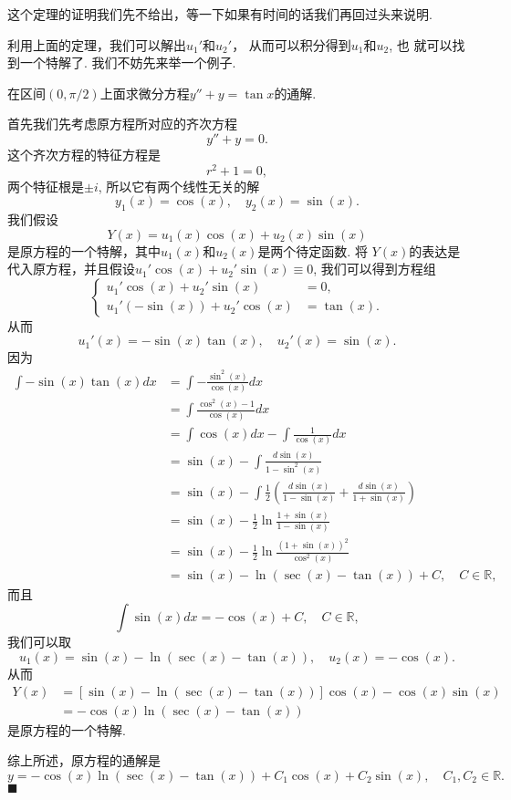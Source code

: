 \documentclass[a4paper, titlepage, twoside]{article}
\newenvironment{jie}{\noindent{\bf 解:}}{\hfill$\blacksquare$\par}
\numberwithin{equation}{section}
\begin{document}
这个定理的证明我们先不给出，等一下如果有时间的话我们再回过头来说明. 

利用上面的定理，我们可以解出$u_1'$和$u_2'$， 从而可以积分得到$u_1$和$u_2$, 也
就可以找到一个特解了. 我们不妨先来举一个例子. 

\begin{example}
	在区间$(0,\pi/2)$上面求微分方程$y'' +y = \tan x$的通解. 
\end{example}
\begin{jie}
	首先我们先考虑原方程所对应的齐次方程
	$$ y'' + y =0 . $$
	这个齐次方程的特征方程是
	$$ r^2 + 1 =0, $$
	两个特征根是$\pm i$, 所以它有两个线性无关的解
	$$ y_1(x) = \cos(x), \quad y_2(x) = \sin(x).$$
	我们假设
	$$ Y(x) = u_1(x) \cos(x) + u_2(x) \sin(x) $$
	是原方程的一个特解，其中$u_1(x)$和$u_2(x)$是两个待定函数. 将
	$Y(x)$的表达是代入原方程，并且假设$u_1'\cos(x) + u_2'\sin(x) \equiv
	0$, 我们可以得到方程组
	$$ 
	\begin{cases}
		u_1' \cos(x) + u_2'\sin(x) &= 0, \\
		u_1' (-\sin(x)) + u_2'\cos(x) & = \tan(x).
	\end{cases}
	$$
	从而
	$$ u_1'(x) = -\sin(x) \tan(x), \quad  u_2'(x) = \sin(x).$$
	因为
	\begin{align*} 
		\int -\sin(x)\tan(x) dx &= \int -\frac{\sin^2(x)}{\cos(x)}dx
		\\ 
		&= \int \frac{\cos^2(x) -1 }{\cos(x)} dx \\ 
		&= \int  \cos(x) dx - \int \frac{1}{\cos(x)}dx \\
		&= \sin(x) - \int \frac{d\sin(x)}{1-\sin^2(x)} \\
		&= \sin(x) - \int \frac{1}{2}\left(\frac{d\sin(x)}{1-\sin(x)}
			+\frac{d\sin(x)}{1+\sin(x)}\right) \\
		&= \sin(x) - \frac{1}{2}\ln\frac{1+\sin(x)}{1-\sin(x)} \\
		&= \sin(x) - \frac{1}{2} \ln \frac{(1+\sin(x))^2}{\cos^2(x)}
			\\
		&= \sin(x) - \ln(\sec(x) -\tan(x)) + C, \quad C\in \mathbb{R},
	\end{align*}
	而且
	$$ \int \sin(x) dx = -\cos(x) + C, \quad C\in \mathbb{R},$$
	我们可以取
	$$ u_1(x) = \sin(x) - \ln(\sec(x) -\tan(x) ) , \quad u_2(x) =
	-\cos(x).$$ 
	从而
	\begin{align*} 
		Y(x) &= \left[\sin(x)-\ln(\sec(x) -\tan(x))\right]\cos(x)
	-\cos(x)\sin(x)\\
	&=- \cos(x) \ln(\sec(x)-\tan(x)) 
	\end{align*}
	是原方程的一个特解. 

	综上所述，原方程的通解是
	$$ y= -\cos(x)\ln(\sec(x)-\tan(x)) +  C_1 \cos(x) + C_2 \sin(x), \quad 
	C_1, C_2\in \mathbb{R}.$$
\end{jie}
\end{document}
